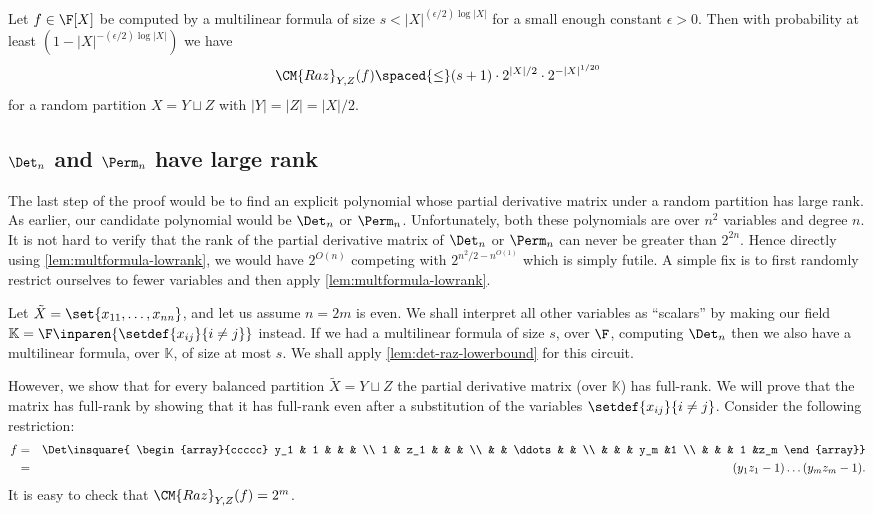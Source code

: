 \begin{lemma}\label{lem:multformula-lowrank}
  Let $f \in \F[X]$ be computed by a multilinear formula of size $s < |X|^{(\epsilon/2) \log |X|}$ for a small enough constant $\epsilon > 0$. 
Then with probability at least $(1 - |X|^{-(\epsilon/2)\log |X|})$ we have $$\CM{Raz}_{Y,Z}(f) \spaced{\leq} (s+1)\cdot 2^{|X|/2} \cdot 2^{-|X|^{1/20}}$$ for a random partition $X = Y \sqcup Z$ with $|Y| = |Z| = |X|/2$.
\end{lemma}

\subsection{$\Det_n$ and $\Perm_n$ have large rank}

The last step of the proof would be to find an explicit polynomial whose partial derivative matrix under a random partition has large rank. 
As earlier, our candidate polynomial would be $\Det_n$ or $\Perm_n$. 
Unfortunately, both these polynomials are over $n^2$ variables and degree $n$. 
It is not hard to verify that the rank of the partial derivative matrix of $\Det_n$ or $\Perm_n$ can never be greater than $2^{2n}$. 
Hence directly using \autoref{lem:multformula-lowrank}, we would have $2^{O(n)}$ competing with $2^{n^2/2 - n^{O(1)}}$ which is simply futile. 
A simple fix is to first randomly restrict ourselves to fewer variables and then apply \autoref{lem:multformula-lowrank}. 

Let $\tilde{X} = \set{x_{11},\ldots, x_{nn}}$, and let us assume $n = 2m$ is even. We shall interpret all other variables as ``scalars'' by making our field $\mathbb{K} = \F\inparen{\setdef{x_{ij}}{i\neq j}}$ instead. If we had a multilinear formula of size $s$, over $\F$, computing $\Det_n$ then we also have a multilinear formula, over $\mathbb{K}$, of size at most $s$. We shall apply \autoref{lem:det-raz-lowerbound} for this circuit.

However, we show that for every balanced partition $\tilde{X} = Y \sqcup Z$ the partial derivative matrix (over $\mathbb{K}$) has full-rank. We will prove that the matrix has full-rank by showing that it has full-rank even after a substitution of the variables $\setdef{x_{ij}}{i\neq j}$. Consider the following restriction:
\begin{eqnarray*}
f & = & \Det \insquare{ \begin{array}{ccccc}
y_1 & 1   &        &     &    \\
1   & z_1 &        &     &    \\
    &     & \ddots &     &    \\
    &     &        & y_m &1   \\
    &     &        & 1   &z_m 
  \end{array}}\\
 &= & (y_1z_1 - 1)\dots (y_mz_m - 1).
\end{eqnarray*}
It is easy to check that $\CM{Raz}_{Y,Z}(f) = 2^m$. 

